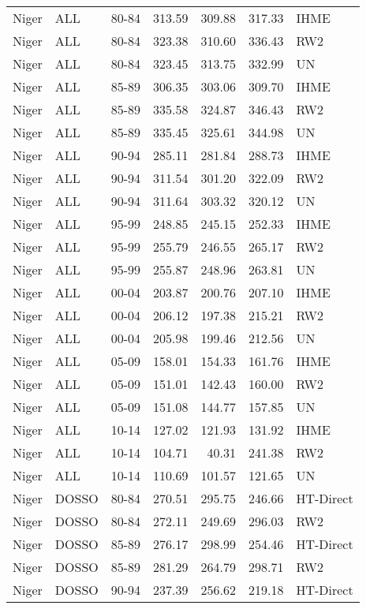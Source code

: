 \begin{longtable}{lllrrrl}
  Niger & ALL & 80-84 & 313.59 & 309.88 & 317.33 & IHME \\ 
  Niger & ALL & 80-84 & 323.38 & 310.60 & 336.43 & RW2 \\ 
  Niger & ALL & 80-84 & 323.45 & 313.75 & 332.99 & UN \\ 
  Niger & ALL & 85-89 & 306.35 & 303.06 & 309.70 & IHME \\ 
  Niger & ALL & 85-89 & 335.58 & 324.87 & 346.43 & RW2 \\ 
  Niger & ALL & 85-89 & 335.45 & 325.61 & 344.98 & UN \\ 
  Niger & ALL & 90-94 & 285.11 & 281.84 & 288.73 & IHME \\ 
  Niger & ALL & 90-94 & 311.54 & 301.20 & 322.09 & RW2 \\ 
  Niger & ALL & 90-94 & 311.64 & 303.32 & 320.12 & UN \\ 
  Niger & ALL & 95-99 & 248.85 & 245.15 & 252.33 & IHME \\ 
  Niger & ALL & 95-99 & 255.79 & 246.55 & 265.17 & RW2 \\ 
  Niger & ALL & 95-99 & 255.87 & 248.96 & 263.81 & UN \\ 
  Niger & ALL & 00-04 & 203.87 & 200.76 & 207.10 & IHME \\ 
  Niger & ALL & 00-04 & 206.12 & 197.38 & 215.21 & RW2 \\ 
  Niger & ALL & 00-04 & 205.98 & 199.46 & 212.56 & UN \\ 
  Niger & ALL & 05-09 & 158.01 & 154.33 & 161.76 & IHME \\ 
  Niger & ALL & 05-09 & 151.01 & 142.43 & 160.00 & RW2 \\ 
  Niger & ALL & 05-09 & 151.08 & 144.77 & 157.85 & UN \\ 
  Niger & ALL & 10-14 & 127.02 & 121.93 & 131.92 & IHME \\ 
  Niger & ALL & 10-14 & 104.71 & 40.31 & 241.38 & RW2 \\ 
  Niger & ALL & 10-14 & 110.69 & 101.57 & 121.65 & UN \\ 
  Niger & DOSSO & 80-84 & 270.51 & 295.75 & 246.66 & HT-Direct \\ 
  Niger & DOSSO & 80-84 & 272.11 & 249.69 & 296.03 & RW2 \\ 
  Niger & DOSSO & 85-89 & 276.17 & 298.99 & 254.46 & HT-Direct \\ 
  Niger & DOSSO & 85-89 & 281.29 & 264.79 & 298.71 & RW2 \\ 
  Niger & DOSSO & 90-94 & 237.39 & 256.62 & 219.18 & HT-Direct \\ 

\end{longtable}
